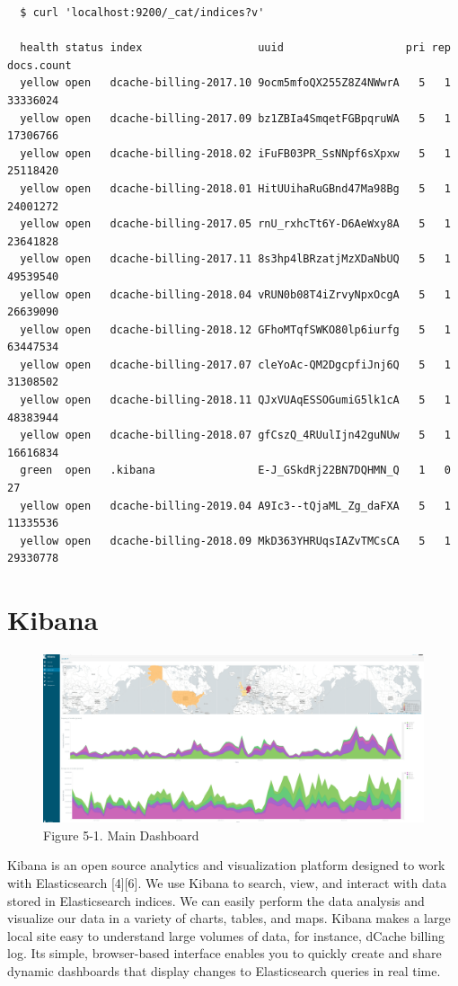 \documentclass[]{article}
\begin{document}
\begin{verbatim}
  $ curl 'localhost:9200/_cat/indices?v'

  health status index                  uuid                   pri rep docs.count
  yellow open   dcache-billing-2017.10 9ocm5mfoQX255Z8Z4NWwrA   5   1   33336024
  yellow open   dcache-billing-2017.09 bz1ZBIa4SmqetFGBpqruWA   5   1   17306766
  yellow open   dcache-billing-2018.02 iFuFB03PR_SsNNpf6sXpxw   5   1   25118420
  yellow open   dcache-billing-2018.01 HitUUihaRuGBnd47Ma98Bg   5   1   24001272
  yellow open   dcache-billing-2017.05 rnU_rxhcTt6Y-D6AeWxy8A   5   1   23641828
  yellow open   dcache-billing-2017.11 8s3hp4lBRzatjMzXDaNbUQ   5   1   49539540
  yellow open   dcache-billing-2018.04 vRUN0b08T4iZrvyNpxOcgA   5   1   26639090
  yellow open   dcache-billing-2018.12 GFhoMTqfSWKO80lp6iurfg   5   1   63447534
  yellow open   dcache-billing-2017.07 cleYoAc-QM2DgcpfiJnj6Q   5   1   31308502
  yellow open   dcache-billing-2018.11 QJxVUAqESSOGumiG5lk1cA   5   1   48383944
  yellow open   dcache-billing-2018.07 gfCszQ_4RUulIjn42guNUw   5   1   16616834
  green  open   .kibana                E-J_GSkdRj22BN7DQHMN_Q   1   0         27
  yellow open   dcache-billing-2019.04 A9Ic3--tQjaML_Zg_daFXA   5   1   11335536
  yellow open   dcache-billing-2018.09 MkD363YHRUqsIAZvTMCsCA   5   1   29330778
\end{verbatim}

\section{Kibana}\label{kibana}

\begin{figure}[htbp]
\centering
\includegraphics{images/kibana.png}
\caption{Figure 5-1. Main Dashboard}
\end{figure}

Kibana is an open source analytics and visualization platform designed
to work with Elasticsearch {[}4{]}{[}6{]}. We use Kibana to search,
view, and interact with data stored in Elasticsearch indices. We can
easily perform the data analysis and visualize our data in a variety of
charts, tables, and maps. Kibana makes a large local site easy to
understand large volumes of data, for instance, dCache billing log. Its
simple, browser-based interface enables you to quickly create and share
dynamic dashboards that display changes to Elasticsearch queries in real
time.
\end{document}
